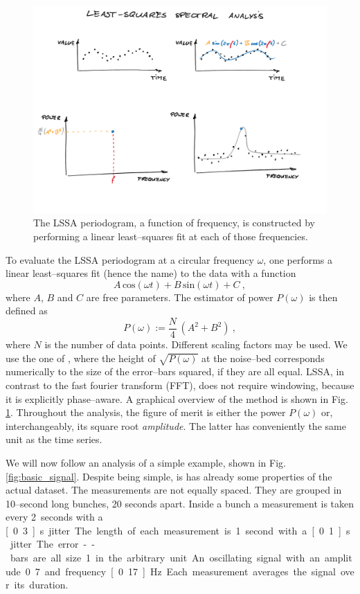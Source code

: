 \begin{figure}
  \centering \includegraphics[width=\linewidth]{gfx/axions/LSSA}
  \caption{The LSSA periodogram, a function of frequency, is constructed by performing a linear least--squares fit at each of those frequencies.}
  \label{fig:LSSA_overview}
\end{figure}

To evaluate the LSSA periodogram at a circular frequency $\omega$, one performs a linear least--squares fit (hence the name) to the data with a function
\begin{equation}
  A\,\mathrm{cos}(\omega t) + B\,\mathrm{sin}(\omega t) + C \ ,
\end{equation}
where $A$, $B$ and $C$ are free parameters. The estimator of power $P(\omega)$ is then defined as
\begin{equation}
  P(\omega) := \frac{N}{4} \, \left( A^2 + B^2 \right) \ ,
\end{equation}
where $N$ is the number of data points. Different scaling factors may be used. We use the one of \cite{Scargle1982}, where the height of $\sqrt{P(\omega)}$ at the noise--bed corresponds numerically to the size of the error--bars squared, if they are all equal. LSSA, in contrast to the fast fourier transform (FFT), does not require windowing, because it is explicitly phase--aware. A graphical overview of the method is shown in Fig.\,\ref{fig:LSSA_overview}. Throughout the analysis, the figure of merit is either the power $P(\omega)$ or, interchangeably, its square root \emph{amplitude}. The latter has conveniently the same unit as the time series.

We will now follow an analysis of a simple example, shown in Fig.\,\ref{fig:basic_signal}. Despite being simple, is has already some properties of the actual dataset. The measurements are not equally spaced. They are grouped in 10--second long bunches, 20 seconds apart. Inside a bunch a measurement is taken every 2~seconds with a \unit[0.3]{s} jitter. The length of each measurement is 1~second with a \unit[0.1]{s} jitter. The error--bars are all size 1 in the arbitrary unit. An oscillating signal with an amplitude 0.7 and frequency \unit[0.17]{Hz}. Each measurement averages the signal over its duration.


